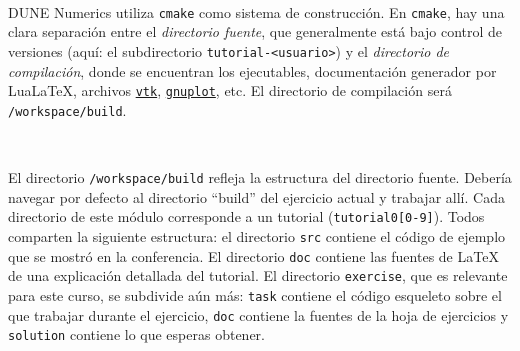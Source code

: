 \documentclass[9pt,a3paper]{scrartcl}
\begin{document}
\

DUNE Numerics utiliza \verb!cmake! como sistema de construcción.
En \verb!cmake!, hay una clara separación entre el
\textit{directorio fuente}, que generalmente está bajo control de
versiones (aquí: el subdirectorio \verb!tutorial-<usuario>!) y el
\textit{directorio de compilación}, donde se encuentran los
ejecutables, documentación generador por Lua\LaTeX{}, archivos
\href {https://vtk.org}{\texttt{vtk}},
\href{http://www.gnuplot.info}{\texttt{gnuplot}}, etc.
El directorio de compilación será \verb!/workspace/build!.

\

El directorio \verb!/workspace/build! refleja la estructura del directorio
fuente.
Debería navegar por defecto al directorio ``build'' del ejercicio
actual y trabajar allí.
Cada directorio de este módulo corresponde a un tutorial
(\verb!tutorial0[0-9]!).
Todos comparten la siguiente estructura: el directorio \verb!src!
contiene el código de ejemplo que se mostró en la conferencia.
El directorio \verb!doc! contiene las fuentes de \LaTeX{} de una
explicación detallada del tutorial.
El directorio \verb!exercise!, que es relevante para este curso, se
subdivide aún más: \verb!task! contiene el código esqueleto sobre el
que trabajar durante el ejercicio, \verb!doc! contiene la fuentes de
la hoja de ejercicios y \verb!solution! contiene lo que esperas
obtener.

\
\end{document}
